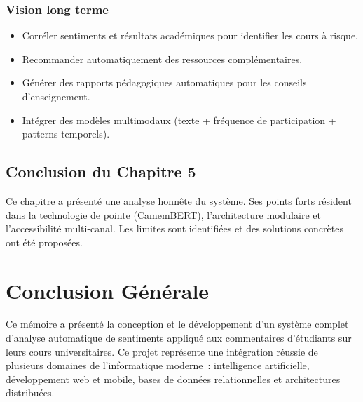\documentclass[12pt,a4paper,oneside]{report}
\begin{document}
\subsection{Vision long terme}

\begin{definitionbox}
\begin{itemize}
  \item Corréler sentiments et résultats académiques pour identifier les
        cours à risque.
  \item Recommander automatiquement des ressources complémentaires.
  \item Générer des rapports pédagogiques automatiques pour les conseils
        d'enseignement.
  \item Intégrer des modèles multimodaux (texte + fréquence de participation
        + patterns temporels).
\end{itemize}
\end{definitionbox}

\section*{Conclusion du Chapitre 5}
Ce chapitre a présenté une analyse honnête du système. Ses points forts
résident dans la technologie de pointe (CamemBERT), l'architecture modulaire
et l'accessibilité multi-canal. Les limites sont identifiées et des solutions
concrètes ont été proposées.
\cleardoublepage

\chapter*{Conclusion Générale}

Ce mémoire a présenté la conception et le développement d'un système complet
d'analyse automatique de sentiments appliqué aux commentaires d'étudiants
sur leurs cours universitaires. Ce projet représente une intégration réussie
de plusieurs domaines de l'informatique moderne~: intelligence artificielle,
développement web et mobile, bases de données relationnelles et architectures
distribuées.
\end{document}
